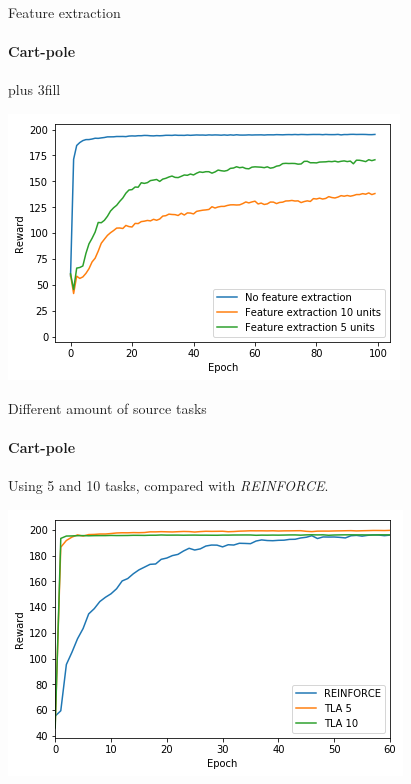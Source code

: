 \begin{frame}[fragile]{Feature extraction}
\framesubtitle{Cart-pole}
\vskip0pt plus 3fill
\begin{center}
    \includegraphics[width=.8\linewidth]{results/CartPole/feature_extraction.png}
\end{center}
\end{frame}

\begin{frame}[fragile]{Different amount of source tasks}
\framesubtitle{Cart-pole}
Using 5 and 10 tasks, compared with \textit{REINFORCE}.
\begin{center}
    \includegraphics[width=.8\linewidth]{results/CartPole/no_sparse_transfer/reward_target_re-akt5-akt10.png}
\end{center}
\end{frame}

